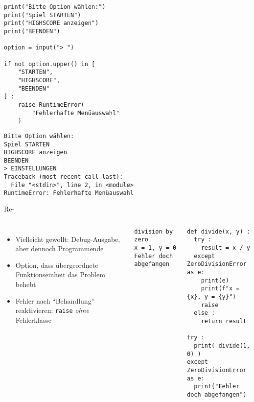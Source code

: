 \begin{frame}[fragile]
%
\begin{tcbraster}[raster columns=2,
                  raster equal height,
                  nobeforeafter,
                  raster column skip=0.5cm]
\begin{codebox}
\begin{verbatim}
print("Bitte Option wählen:")
print("Spiel STARTEN")
print("HIGHSCORE anzeigen")
print("BEENDEN")

option = input("> ")

if not option.upper() in [
    "STARTEN",
    "HIGHSCORE",
    "BEENDEN"
] :
    raise RuntimeError(
        "Fehlerhafte Menüauswahl"
    )
\end{verbatim}
\end{codebox}
%
\begin{cmdbox}
\begin{verbatim}
Bitte Option wählen:
Spiel STARTEN
HIGHSCORE anzeigen
BEENDEN
> EINSTELLUNGEN
Traceback (most recent call last):
  File "<stdin>", line 2, in <module>
RuntimeError: Fehlerhafte Menüauswahl
\end{verbatim}
\end{cmdbox}
\end{tcbraster}
%
\end{frame}


\begin{frame}[fragile]{Re-}
%
\begin{columns}[T]
\begin{itemize}
\item Vielleicht gewollt: Debug-Ausgabe, aber dennoch Programmende
\item Option, dass übergeordnete Funktionseinheit das Problem behebt
\item[\Thus] Fehler nach \enquote{Behandlung} reaktivieren: \texttt{raise} \emph{ohne} Fehlerklasse
\end{itemize}
%
\vspace{15pt}
\begin{cmdbox}
\begin{verbatim}
division by zero
x = 1, y = 0
Fehler doch abgefangen
\end{verbatim}
\end{cmdbox}
%
\begin{codebox}
\begin{verbatim}
def divide(x, y) :
  try :
    result = x / y
  except ZeroDivisionError as e:
    print(e)
    print(f"x = {x}, y = {y}")
    raise
  else :
    return result

try :
  print( divide(1, 0) )
except ZeroDivisionError as e:
  print("Fehler doch abgefangen")
\end{verbatim}
\end{codebox}
%
\end{columns}
%
\end{frame}

